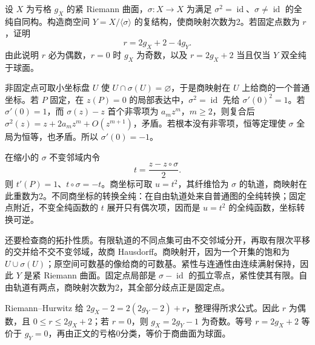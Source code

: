 \begin{exercise}\label{b3:ex:A-3}
设 \(X\) 为亏格 \(g_X\) 的紧 Riemann 曲面，\(\sigma:X\rightarrow X\) 为满足 \(\sigma^2=\operatorname{id}\)、\(\sigma\ne\operatorname{id}\) 的全纯自同构。构造商空间 \(Y=X/\langle\sigma\rangle\) 的复结构，使商映射次数为2。若固定点数为 \(r\)，证明
\[
 r=2g_X+2-4g_Y.
\]
由此说明 \(r\) 必为偶数，\(r=0\) 时 \(g_X\) 为奇数，以及 \(r=2g_X+2\) 当且仅当 \(Y\) 双全纯于球面。
\end{exercise}
\begin{solution}
非固定点可取小坐标盘 \(U\) 使 \(U\cap\sigma(U)=\varnothing\)，于是商映射在 \(U\) 上给商的一个普通坐标。若 \(P\) 固定，在 \(z(P)=0\) 的局部表达中，\(\sigma^2=\operatorname{id}\) 先给 \(\sigma'(0)^2=1\)。若 \(\sigma'(0)=1\)，而 \(\sigma(z)-z\) 首个非零项为 \(a_mz^m\)，\(m\ge2\)，则复合后 \(\sigma^2(z)=z+2a_mz^m+O(z^{m+1})\)，矛盾。若根本没有非零项，恒等定理使 \(\sigma\) 全局为恒等，也矛盾。所以 \(\sigma'(0)=-1\)。

在缩小的 \(\sigma\) 不变邻域内令
\[
 t=\frac{z-z\circ\sigma}{2}.
\]
则 \(t'(P)=1\)、\(t\circ\sigma=-t\)。商坐标可取 \(u=t^2\)，其纤维恰为 \(\sigma\) 的轨道，商映射在此重数为2。不同商坐标的转换全纯：在自由轨道处来自普通图的全纯转换；固定点附近，不变全纯函数的 \(t\) 展开只有偶次项，因而是 \(u=t^2\) 的全纯函数，坐标转换可逆。

还要检查商的拓扑性质。有限轨道的不同点集可由不交邻域分开，再取有限次平移的交并给不交不变邻域，故商 Hausdorff。商映射开，因为一个开集的饱和为 \(U\cup\sigma(U)\)；原空间可数基的像给商的可数基。紧性与连通性由连续满射保持，因此 \(Y\) 是紧 Riemann 曲面。固定点局部是 \(\sigma-\operatorname{id}\) 的孤立零点，紧性使其有限。自由轨道有两点，商映射次数为2，其全部分歧点正是固定点。

Riemann--Hurwitz 给 \(2g_X-2=2(2g_Y-2)+r\)，整理得所求公式。因此 \(r\) 为偶数，且 \(0\le r\le2g_X+2\)；若 \(r=0\)，则 \(g_X=2g_Y-1\) 为奇数。等号 \(r=2g_X+2\) 等价于 \(g_Y=0\)，再由正文的亏格0分类，等价于商曲面为球面。
\end{solution}

